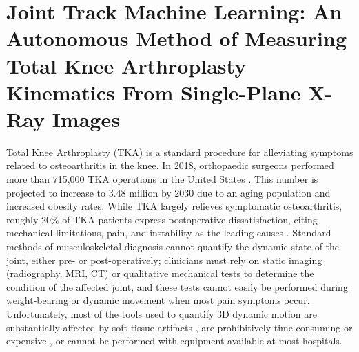 \chapter{Joint Track Machine Learning: An Autonomous Method of Measuring Total Knee Arthroplasty Kinematics From Single-Plane X-Ray Images}{\renewcommand*{\thefootnote}{\fnsymbol{footnote}}


\label{sec:jtml}
Total Knee Arthroplasty (TKA) is a standard procedure for alleviating symptoms
related to osteoarthritis in the knee. In 2018, orthopaedic surgeons performed
more than 715,000 TKA operations in the United States
\cite{agencyforhealthcareresearchandqualityHCUPFastStats}. This number is
projected to increase to 3.48 million by 2030
\cite{kurtzProjectionsPrimaryRevision2007} due to an aging population and
increased obesity rates. While TKA largely relieves symptomatic osteoarthritis,
roughly 20\% of TKA patients express postoperative dissatisfaction, citing
mechanical limitations, pain, and instability as the leading causes
\cite{bakerRolePainFunction2007,bournePatientSatisfactionTotal2010,scottPredictingDissatisfactionFollowing2010}.
Standard methods of musculoskeletal diagnosis cannot quantify the dynamic state
of the joint, either pre- or post-operatively; clinicians must rely on static
imaging (radiography, MRI, CT) or qualitative mechanical tests to determine the
condition of the affected joint, and these tests cannot easily be performed
during weight-bearing or dynamic movement when most pain symptoms occur.
Unfortunately, most of the tools used to quantify 3D dynamic motion are
substantially affected by soft-tissue artifacts
\cite{gaoInvestigationSoftTissue2008,stagniQuantificationSoftTissue2005,linEffectsSoftTissue2016},
are prohibitively time-consuming or expensive
\cite{daemsValidationThreedimensionalTotal2016}, or cannot be performed with
equipment available at most hospitals.

}
